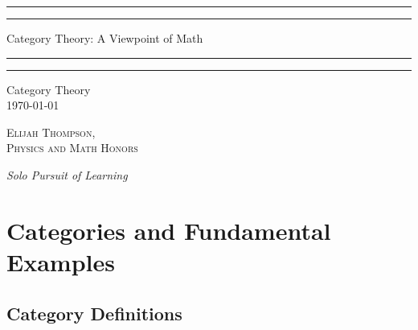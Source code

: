 \documentclass[12pt]{report}
\begin{document}

\begin{titlepage}
    \centering
    \scshape
    \vspace*{\baselineskip}
    \rule{\textwidth}{1.6pt}\vspace*{-\baselineskip}\vspace*{2pt}
    \rule{\textwidth}{0.4pt}
    
    \vspace{0.75\baselineskip}
    
    {\LARGE Category Theory: A Viewpoint of Math}
    
    \vspace{0.75\baselineskip}
    
    \rule{\textwidth}{0.4pt}\vspace*{-\baselineskip}\vspace{3.2pt}
    \rule{\textwidth}{1.6pt}
    
    \vspace{2\baselineskip}
    Category Theory \\
    \vspace*{3\baselineskip}
    \monthdayyeardate\today \\
    \vspace*{5.0\baselineskip}
    
    {\scshape\Large Elijah Thompson, \\ Physics and Math Honors\\}
    
    \vspace{1.0\baselineskip}
    \textit{Solo Pursuit of Learning}
\end{titlepage}

\tableofcontents





\chapter{Categories and Fundamental Examples}

\section{Category Definitions}
\end{document}
